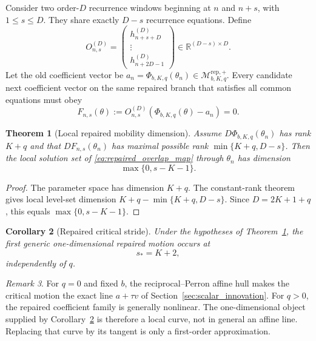 \documentclass[11pt]{amsart}
\numberwithin{equation}{section}
\theoremstyle{plain}
\newtheorem{theorem}{Theorem}[section]
\newtheorem{corollary}[theorem]{Corollary}
\theoremstyle{definition}
\theoremstyle{remark}
\newtheorem{remark}[theorem]{Remark}
\begin{document}
Consider two order-$D$ recurrence windows beginning at $n$ and $n+s$, with $1\leq s\leq D$. They share exactly $D-s$ recurrence equations. Define
\begin{equation}
O^{(D)}_{n,s}=\begin{pmatrix}h^{(D)}_{n+s+D}\\ \vdots\\ h^{(D)}_{n+2D-1}\end{pmatrix}\in\mathbb R^{(D-s)\times D}.
\label{eq:repaired_overlap_matrix}
\end{equation}
Let the old coefficient vector be $a_n=\Phi_{b,K,q}(\theta_n)\in\mathcal M^{\mathrm{rep},+}_{b,K,q}$. Every candidate next coefficient vector on the same repaired branch that satisfies all common equations must obey
\begin{equation}
F_{n,s}(\theta):=O^{(D)}_{n,s}\left(\Phi_{b,K,q}(\theta)-a_n\right)=0.
\label{eq:repaired_overlap_map}
\end{equation}

\begin{theorem}[Local repaired mobility dimension]
\label{thm:repaired_mobility_dimension}
Assume $D\Phi_{b,K,q}(\theta_n)$ has rank $K+q$ and that $DF_{n,s}(\theta_n)$ has maximal possible rank $\min\{K+q,D-s\}$. Then the local solution set of \eqref{eq:repaired_overlap_map} through $\theta_n$ has dimension
\begin{equation}
\boxed{\max\{0,s-K-1\}.}
\label{eq:repaired_generic_mobility}
\end{equation}
\end{theorem}

\begin{proof}
The parameter space has dimension $K+q$. The constant-rank theorem gives local level-set dimension $K+q-\min\{K+q,D-s\}$. Since $D=2K+1+q$, this equals $\max\{0,s-K-1\}$.
\end{proof}

\begin{corollary}[Repaired critical stride]
\label{cor:repaired_critical_stride}
Under the hypotheses of Theorem~\ref{thm:repaired_mobility_dimension}, the first generic one-dimensional repaired motion occurs at
\begin{equation}\boxed{s_*=K+2,}\label{eq:repaired_critical_stride}\end{equation}
independently of $q$.
\end{corollary}

\begin{remark}
\label{rem:rigid_line_repaired_curve}
For $q=0$ and fixed $b$, the reciprocal--Perron affine hull makes the critical motion the exact line $a+\tau v$ of Section~\ref{sec:scalar_innovation}. For $q>0$, the repaired coefficient family is generally nonlinear. The one-dimensional object supplied by Corollary~\ref{cor:repaired_critical_stride} is therefore a local curve, not in general an affine line. Replacing that curve by its tangent is only a first-order approximation.
\end{remark}
\end{document}
